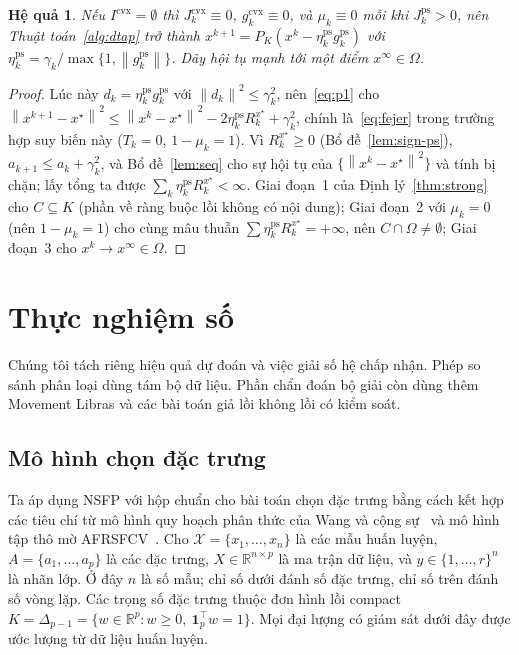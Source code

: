 \documentclass[]{interact}
\theoremstyle{plain}
\newtheorem{corollary}[theorem]{Hệ quả}
\theoremstyle{definition}
\theoremstyle{remark}
\newcommand{\R}{\mathbb{R}}
\newcommand{\norm}[1]{\left\lVert #1 \right\rVert}
\newcommand{\cvx}{\mathrm{cvx}}
\newcommand{\ps}{\mathrm{ps}}
\begin{document}
\begin{corollary}\label{cor:ps}
Nếu $I^{\cvx}=\emptyset$ thì $J^{\cvx}_k\equiv0$, $g^{\cvx}_k\equiv0$, và $\mu_k\equiv0$
mỗi khi $J^{\ps}_k>0$, nên Thuật toán~\ref{alg:dtap} trở thành
$x^{k+1}=P_K(x^k-\eta^{\ps}_k g^{\ps}_k)$ với $\eta^{\ps}_k=\gamma_k/\max\{1,\norm{g^{\ps}_k}\}$.
Dãy hội tụ mạnh tới một điểm $x^\infty\in\Omega$.
\end{corollary}
\begin{proof}
Lúc này $d_k=\eta^{\ps}_k g^{\ps}_k$ với $\norm{d_k}^2\le\gamma_k^2$, nên~\eqref{eq:p1} cho
$\norm{x^{k+1}-x^\star}^2\le\norm{x^k-x^\star}^2-2\eta^{\ps}_k R^{x^\star}_k+\gamma_k^2$,
chính là~\eqref{eq:fejer} trong trường hợp suy biến này ($T_k=0$, $1-\mu_k=1$). Vì
$R^{x^\star}_k\ge0$ (Bổ đề~\ref{lem:sign-ps}), $a_{k+1}\le a_k+\gamma_k^2$, và
Bổ đề~\ref{lem:seq} cho sự hội tụ của $\{\norm{x^k-x^\star}^2\}$ và tính bị chặn;
lấy tổng ta được $\sum_k\eta^{\ps}_k R^{x^\star}_k<\infty$. Giai đoạn~1 của
Định lý~\ref{thm:strong} cho $C\subseteq K$ (phần về ràng buộc lồi không có nội dung); Giai đoạn~2 với
$\mu_k=0$ (nên $1-\mu_k=1$) cho cùng mâu thuẫn $\sum\eta^{\ps}_k R^{x^\star}_k=+\infty$,
nên $C\cap\Omega\ne\emptyset$; Giai đoạn~3 cho $x^k\to x^\infty\in\Omega$.
\end{proof}


\section{Thực nghiệm số}\label{sec:experiments}
Chúng tôi tách riêng hiệu quả dự đoán và việc giải số hệ chấp nhận. Phép so sánh phân loại dùng tám bộ dữ liệu. Phần chẩn đoán bộ giải còn dùng thêm Movement Libras và các bài toán giả lồi không lồi có kiểm soát.

\subsection{Mô hình chọn đặc trưng}\label{sec:fs}
Ta áp dụng NSFP với hộp chuẩn cho bài toán chọn đặc trưng bằng cách kết hợp các tiêu chí từ mô hình quy hoạch phân thức của Wang và cộng sự~\citep{wang2021fractional} và mô hình tập thô mờ AFRSFCV~\citep{wang2026afrsfcv}. Cho $\mathcal{X}=\{x_1,\ldots,x_n\}$ là các mẫu huấn luyện, $A=\{a_1,\ldots,a_p\}$ là các đặc trưng, $X\in\R^{n\times p}$ là ma trận dữ liệu, và $y\in\{1,\ldots,r\}^n$ là nhãn lớp. Ở đây $n$ là số mẫu; chỉ số dưới đánh số đặc trưng, chỉ số trên đánh số vòng lặp. Các trọng số đặc trưng thuộc đơn hình lồi compact $K=\Delta_{p-1}=\{w\in\R^p:w\ge0,\ \mathbf1_p^{\top}w=1\}$. Mọi đại lượng có giám sát dưới đây được ước lượng từ dữ liệu huấn luyện.
\end{document}
